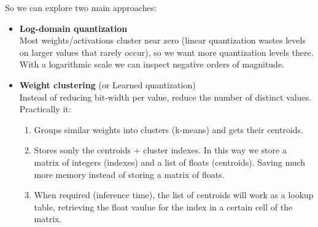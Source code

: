 So we can explore two main approaches:
\begin{itemize}
    \item \textbf{Log-domain quantization} \\
    Most weights/activations cluster near zero (linear quantization wastes levels on larger values that rarely occur), so we want more quantization levels there. With a logarithmic scale we can inspect negative orders of magnitude.
    
    \item \textbf{Weight clustering} (or Learned quantization)   \\
    Instead of reducing bit-width per value, reduce the number of distinct values. Practically it:
    \begin{enumerate}
        \item Groups similar weights into clusters (k-means) and gets their centroids.
        \item Stores sonly the centroids + cluster indexes. In this way we store a matrix of integers (indexes) and a list of floats (centroids). Saving much more memory instead of storing a matrix of floats.
        \item When required (inference time), the list of centroids will work as a lookup table, retrieving the float vaulue for the index in a certain cell of the matrix.
    \end{enumerate}
\end{itemize}

